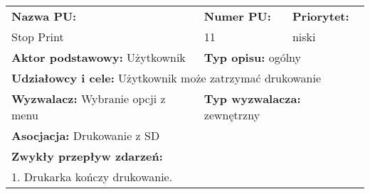 \documentclass{article}
\begin{document}
\begin{enumerate}[label=\arabic*.]
\newpage
\begin{tabular}{|p{5cm}|p{3cm}|p{3cm}|p{3cm}|p{}|p{3cm}|}
\hline
\multicolumn{4}{|l|}{\textbf{Nazwa PU:}} & \multicolumn{1}{l|}{\textbf{Numer PU:}} & \multicolumn{1}{|l|}{\textbf{Priorytet:} } \\ 
\multicolumn{4}{|l|}{Stop Print} & \multicolumn{1}{l|}{11} & \multicolumn{1}{|l|}{niski}\\ \hline
\multicolumn{3}{|l|}{\textbf{Aktor podstawowy:} Użytkownik} & \multicolumn{3}{l|}{\textbf{Typ opisu:} ogólny} \\ \hline
\multicolumn{6}{|l|}{\textbf{Udziałowcy i cele:} Użytkownik może zatrzymać drukowanie} \\ \hline
\multicolumn{3}{|l|}{\textbf{Wyzwalacz:} Wybranie opcji z menu} & \multicolumn{3}{l|}{\textbf{Typ wyzwalacza:} zewnętrzny} \\ 
\hline
\multicolumn{6}{|l|}{\textbf{Asocjacja:} Drukowanie z SD} \\ \hline
\multicolumn{6}{|l|}{\textbf{Zwykły przepływ zdarzeń:}} \\
\multicolumn{6}{|l|}{1. Drukarka kończy drukowanie.} \\
\hline
\end{tabular}

\end{enumerate}
\end{document}
